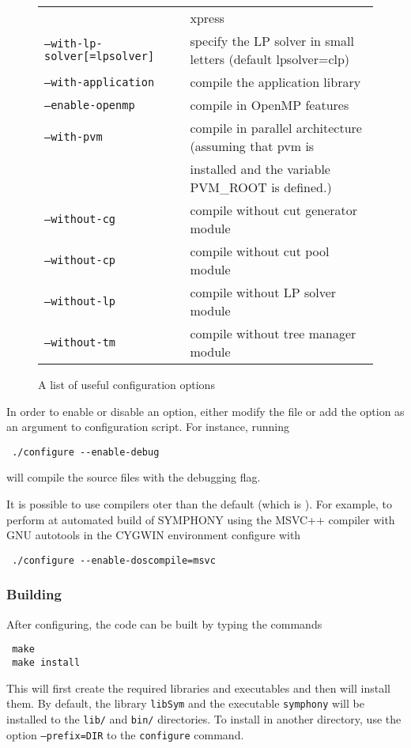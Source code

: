 \begin{figure}[htb]
\begin{tabular}{ll}
& xpress \\
\texttt{--with-lp-solver[=lpsolver]} &  specify the LP solver in small 
letters (default lpsolver=clp) \\
\texttt{--with-application} &  compile the application library \\
\hline
\texttt{--enable-openmp} &   compile in OpenMP features \\
\texttt{--with-pvm } &  compile in parallel architecture (assuming that pvm is \\ 
&installed and the variable PVM\_ROOT is defined.) \\
\texttt{--without-cg} &  compile without cut generator module \\
\texttt{--without-cp} &  compile without cut pool module \\
\texttt{--without-lp} &  compile without LP solver module \\
\texttt{--without-tm} &  compile without tree manager module
\end{tabular}
\caption{A list of useful configuration options \label{conf_opts}}
\end{figure}

In order to enable or disable an option, either modify the file
 or add the option as an argument to configuration
script. For instance, running 
{\color{Brown}
\begin{verbatim}
 ./configure --enable-debug
\end{verbatim}
}
will compile the source files with the debugging flag.

It is possible to use compilers oter than the default (which is ).
For example, to perform at automated build of SYMPHONY using the MSVC++
compiler  with GNU autotools in the CYGWIN environment configure with
{\color{Brown}
\begin{verbatim}
 ./configure --enable-doscompile=msvc
\end{verbatim}
}

\subsubsection{Building}\label{building}

After configuring, the code can be built by typing the commands
{\color{Brown}
\begin{verbatim}
 make
 make install
\end{verbatim}
} This will first create the required libraries and executables and then will
install them. By default, the library {\color{Brown}\texttt{libSym}} and the
executable {\color{Brown}\texttt{symphony}} will be installed to the
{\color{Brown}\texttt{lib/}} and {\color{Brown}\texttt{bin/}} directories. To
install in another directory, use the option
{\color{Brown}\texttt{--prefix=DIR}} to the {\color{Brown}\texttt{configure}}
command.

